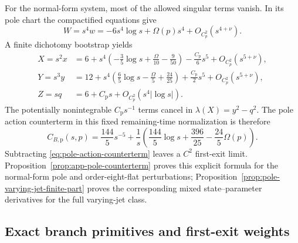 \documentclass[11pt]{amsart}
\numberwithin{equation}{section}
\theoremstyle{definition}
\theoremstyle{remark}
\begin{document}
For the normal-form system, most of the allowed singular terms vanish.
In its pole chart the compactified equations give
\begin{equation}\label{eq:pole-W}
 W=s^4w=-6s^4\log s+\Omega(p)s^4
       +O_{C_p^2}(s^{4+\nu}).
\end{equation}
A finite dichotomy bootstrap yields
\begin{align}
 X=s^2x&=6+s^4\left(-\frac35\log s+
              \frac{\Omega}{10}-\frac9{50}\right)
        -\frac{C_{\mathrm p}}{6}s^5+O_{C_p^2}(s^{5+\nu}),
        \label{eq:pole-X}\\
 Y=s^3y&=12+s^4\left(\frac65\log s-
              \frac{\Omega}{5}+\frac{24}{25}\right)
        +\frac{C_{\mathrm p}}{2}s^5+O_{C_p^2}(s^{5+\nu}),
        \label{eq:pole-Y}\\
 Z=sq&=6+C_{\mathrm p}s+O_{C_p^2}(s^4|\log s|).
        \label{eq:pole-Z}
\end{align}
The potentially nonintegrable $C_{\mathrm p}s^{-1}$ terms cancel in
$\lambda(X)=y^2-q^2$.  The pole action counterterm in this fixed
remaining-time normalization is therefore
\begin{equation}\label{eq:pole-action-counterterm}
 C_{B,\mathrm p}(s,p)=\frac{144}{5}s^{-5}
 +\frac1s\left(\frac{144}{5}\log s+
       \frac{396}{25}-\frac{24}{5}\Omega(p)\right).
\end{equation}
Subtracting \eqref{eq:pole-action-counterterm} leaves a $C^2$ first-exit
limit.  Proposition~\ref{prop:app-pole-counterterm} proves this explicit
formula for the normal-form pole and order-eight-flat perturbations;
Proposition~\ref{prop:pole-varying-jet-finite-part} proves the corresponding
mixed state--parameter derivatives for the full varying-jet class.

\subsection{Exact branch primitives and first-exit weights}
\end{document}
